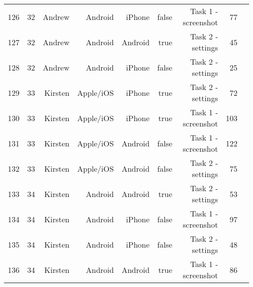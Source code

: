 \documentclass[conference]{IEEEtran}
\begin{document}
\begin{table}[!htp]
\begin{tabular}{lrrrrrrrr}
126 &32 &Andrew &Android &iPhone &false &Task 1 - screenshot &77 \\
127 &32 &Andrew &Android &Android &true &Task 2 - settings &45 \\
128 &32 &Andrew &Android &iPhone &false &Task 2 - settings &25 \\
129 &33 &Kirsten &Apple/iOS &iPhone &true &Task 2 - settings &72 \\
130 &33 &Kirsten &Apple/iOS &iPhone &true &Task 1 - screenshot &103 \\
131 &33 &Kirsten &Apple/iOS &Android &false &Task 1 - screenshot &122 \\
132 &33 &Kirsten &Apple/iOS &Android &false &Task 2 - settings &75 \\
133 &34 &Kirsten &Android &Android &true &Task 2 - settings &53 \\
134 &34 &Kirsten &Android &iPhone &false &Task 1 - screenshot &97 \\
135 &34 &Kirsten &Android &iPhone &false &Task 2 - settings &48 \\
136 &34 &Kirsten &Android &Android &true &Task 1 - screenshot &86 \\
\bottomrule
\end{tabular}
\end{table}
\end{document}
